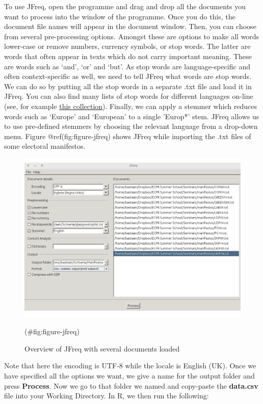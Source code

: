 \documentclass[
]{book}
\begin{document}
To use JFreq, open the programme and drag and drop all the documents you want to process into the window of the programme. Once you do this, the document file names will appear in the document window. Then, you can choose from several pre-processing options. Amongst these are options to make all words lower-case or remove numbers, currency symbols, or stop words. The latter are words that often appear in texts which do not carry important meaning. These are words such as `and', `or' and `but'. As stop words are language-specific and often context-specific as well, we need to tell JFreq what words are stop words. We can do so by putting all the stop words in a separate .txt file and load it in JFreq. You can also find many lists of stop words for different languages on-line (see, for example \href{https://github.com/igorbrigadir/stopwords}{this collection}). Finally, we can apply a stemmer which reduces words such as `Europe' and `European' to a single 'Europ*' stem. JFreq allows us to use pre-defined stemmers by choosing the relevant language from a drop-down menu. Figure @ref(fig:figure-jfreq) shows JFreq while importing the .txt files of some electoral manifestos.

\hfill\break

\begin{figure}
\includegraphics[width=1\linewidth]{figures/jfreq} \caption{Overview of JFreq with several documents loaded}(\#fig:figure-jfreq)
\end{figure}

\hfill\break

Note that here the encoding is UTF-8 while the locale is English (UK). Once we have specified all the options we want, we give a name for the output folder and press \textbf{Process}. Now we go to that folder we named and copy-paste the \textbf{data.csv} file into your Working Directory. In R, we then run the following:
\end{document}
